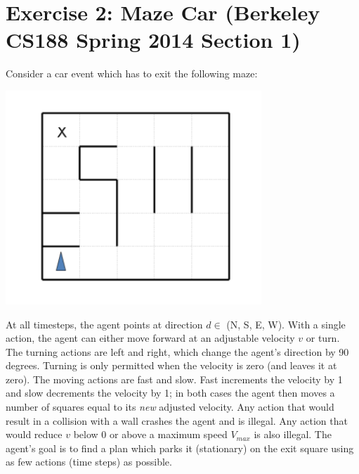 \documentclass[9pt,a4paper]{extarticle}
\begin{document}
   \section*{Exercise 2: Maze Car (Berkeley CS188 Spring 2014 Section 1)}
Consider a car event which has to exit the following maze:
\\
\begin{center}
   \includegraphics[scale=1]{figures/tp1_maze.png}
\end{center}
At all timesteps, the agent points at direction $d \in$ (N, S, E, W). With a single action, the agent
can either move forward at an adjustable velocity $v$ or turn. The turning actions are left and right, which change
the agent’s direction by 90 degrees. Turning is only permitted when the velocity is zero (and leaves it at zero).
The moving actions are fast and slow. Fast increments the velocity by 1 and slow decrements the velocity by 1;
in both cases the agent then moves a number of squares equal to its \textit{new} adjusted velocity. Any action that
would result in a collision with a wall crashes the agent and is illegal. Any action that would reduce $v$ below 0
or above a maximum speed $V_{max}$ is also illegal. The agent’s goal is to find a plan which parks it (stationary)
on the exit square using as few actions (time steps) as possible.
\end{document}
